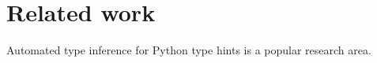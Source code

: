 \chapter{Related work\label{related_work}}

Automated type inference for Python type hints is a popular research area.